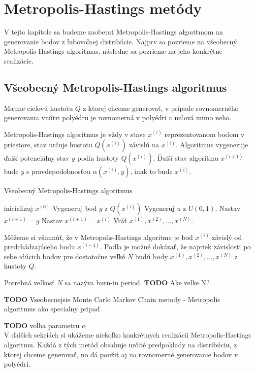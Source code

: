 \chapter{Metropolis-Hastings metódy}

V tejto kapitole sa budeme zaoberať Metropolis-Hastings algoritmom na generovanie bodov z ľubovoľnej distribúcie. Najprv sa pozrieme na všeobecný Metropolis-Hastings algoritmus, následne sa pozrieme na jeho konkrétne realizácie.

\section{Všeobecný Metropolis-Hastings algoritmus}

Majme cieľovú hustotu $Q$ z ktorej chceme generovať, v prípade rovnomerného generovania vnútri polyédru je rovnomerná v polyédri a nulová mimo neho.

Metropolis-Hastings algoritmus je vždy v stave $x^{(i)}$ reprezentovanom bodom v priestore, stav určuje hustotu $Q(x^{(i)})$ závislú na $x^{(i)}$. Algoritmus vygeneruje ďalší potenciálny stav $y$ podľa hustoty $Q(x^{(i)})$. Ďalší stav algoritmu $x^{(i+1)}$ bude $y$ s pravdepodobnosťou $\alpha (x^{(i)},y)$, inak to bude $x^{(i)}$.

\begin{algorithm}[H]
	\caption{Všeobecný Metropolis-Hastings algoritmus \cite{metropolis-hastings_chib}}
	\label{metropolis-hastings}
	\begin{algorithmic}[1]
		\State inicializuj $x^{(0)}$
			\State Vygeneruj bod $y$ z $Q(x^{(i)})$
			\State Vygeneruj $u$ z $U(0,1)$.
				\State Nastav $x^{(i+1)}=y$
			\Else
				\State Nastav $x^{(i+1)}=x^{(i)}$
			\EndIf
		\EndFor
		\State Vráť ${x^{(1)},x^{(2)},\dots,x^{(N)}}$.
	\end{algorithmic}
\end{algorithm}

Môžeme si všimnúť, že v Metropolis-Hastings algoritme je bod $x^{(i)}$ závislý od predchádzajúceho bodu $x^{(i-1)}$. Podľa \cite{metropolis-hastings_chib} je možné dokázať, že napriek závislosti po sebe idúcich bodov pre dostatočne veľké $N$ budú body ${x^{(1)},x^{(2)},\dots,x^{(N)}}$ z hustoty $Q$.

Potrebná veľkosť $N$ sa nazýva burn-in period. \textbf{TODO} Ake velke N?

\textbf{TODO} Vseobecnejsie Monte Carlo Markov Chain metody - Metropolis algoritmus ako specialny pripad

\textbf{TODO} volba parametru $\alpha$
\\
V ďalších sekciách si ukážeme niekoľko konkrétnych realizácii Metropolis-Hastings algoritmu. Každá z tých metód obsahuje určité predpoklady na distribúciu, z ktorej chceme generovať, no dá použiť aj na rovnomerné generovanie bodov v polyédri.
